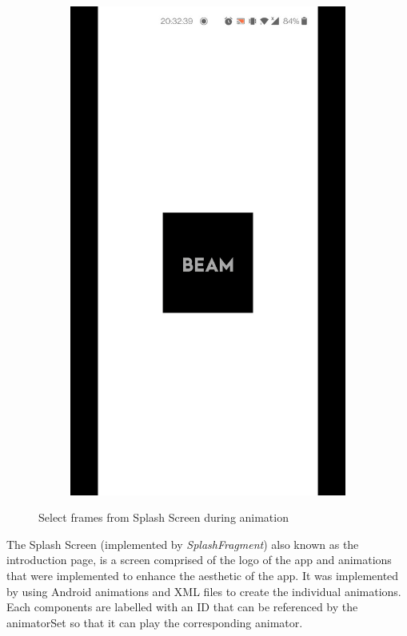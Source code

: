 \documentclass[../report.tex]{subfiles}
\begin{document}
\begin{figure} [H]
\begin{subfigure}[b]{0.28\textwidth}
		\includegraphics[width=\textwidth]{../images/07/02-app-splash-2.jpg}
		\label{fig:app-splash-3}
	\end{subfigure}
	\caption{Select frames from Splash Screen during animation}
	\label{fig:app-splash}
\end{figure}

The Splash Screen (implemented by \textit{SplashFragment}) also known as the introduction page, is a screen comprised of the logo of the app and animations that were implemented to enhance the aesthetic of the app. It was implemented by using Android animations and XML files to create the individual animations. Each components are labelled with an ID that can be referenced by the animatorSet so that it can play the corresponding animator.
\end{document}
